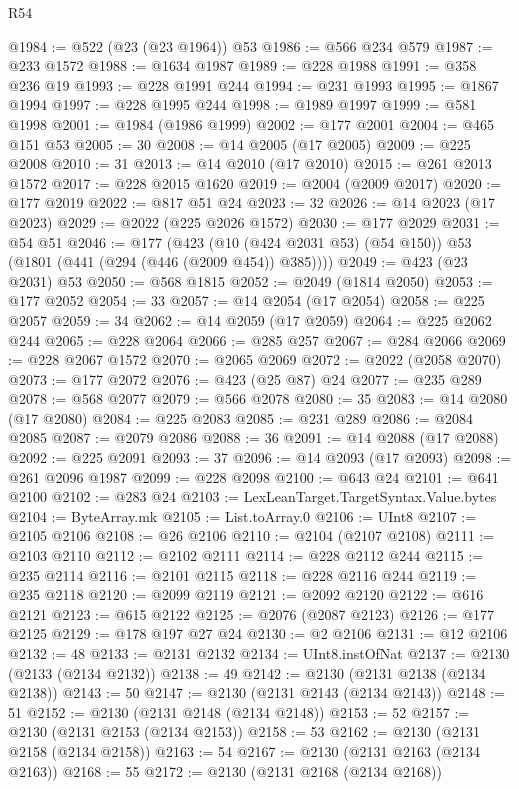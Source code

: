 \begin{lexlean}{R54}
\begin{coremodule}
@1984 := @522 (@23 (@23 @1964)) @53
@1986 := @566 @234 @579
@1987 := @233 @1572
@1988 := @1634 @1987
@1989 := @228 @1988
@1991 := @358 @236 @19
@1993 := @228 @1991 @244
@1994 := @231 @1993
@1995 := @1867 @1994
@1997 := @228 @1995 @244
@1998 := @1989 @1997
@1999 := @581 @1998
@2001 := @1984 (@1986 @1999)
@2002 := @177 @2001
@2004 := @465 @151 @53
@2005 := 30
@2008 := @14 @2005 (@17 @2005)
@2009 := @225 @2008
@2010 := 31
@2013 := @14 @2010 (@17 @2010)
@2015 := @261 @2013 @1572
@2017 := @228 @2015 @1620
@2019 := @2004 (@2009 @2017)
@2020 := @177 @2019
@2022 := @817 @51 @24
@2023 := 32
@2026 := @14 @2023 (@17 @2023)
@2029 := @2022 (@225 @2026 @1572)
@2030 := @177 @2029
@2031 := @54 @51
@2046 := @177
    (@423 (@10 (@424 @2031 @53) (@54 @150)) @53 (@1801 (@441 (@294 (@446 (@2009 @454)) @385))))
@2049 := @423 (@23 @2031) @53
@2050 := @568 @1815
@2052 := @2049 (@1814 @2050)
@2053 := @177 @2052
@2054 := 33
@2057 := @14 @2054 (@17 @2054)
@2058 := @225 @2057
@2059 := 34
@2062 := @14 @2059 (@17 @2059)
@2064 := @225 @2062 @244
@2065 := @228 @2064
@2066 := @285 @257
@2067 := @284 @2066
@2069 := @228 @2067 @1572
@2070 := @2065 @2069
@2072 := @2022 (@2058 @2070)
@2073 := @177 @2072
@2076 := @423 (@25 @87) @24
@2077 := @235 @289
@2078 := @568 @2077
@2079 := @566 @2078
@2080 := 35
@2083 := @14 @2080 (@17 @2080)
@2084 := @225 @2083
@2085 := @231 @289
@2086 := @2084 @2085
@2087 := @2079 @2086
@2088 := 36
@2091 := @14 @2088 (@17 @2088)
@2092 := @225 @2091
@2093 := 37
@2096 := @14 @2093 (@17 @2093)
@2098 := @261 @2096 @1987
@2099 := @228 @2098
@2100 := @643 @24
@2101 := @641 @2100
@2102 := @283 @24
@2103 := LexLeanTarget.TargetSyntax.Value.bytes
@2104 := ByteArray.mk
@2105 := List.toArray.{0}
@2106 := UInt8
@2107 := @2105 @2106
@2108 := @26 @2106
@2110 := @2104 (@2107 @2108)
@2111 := @2103 @2110
@2112 := @2102 @2111
@2114 := @228 @2112 @244
@2115 := @235 @2114
@2116 := @2101 @2115
@2118 := @228 @2116 @244
@2119 := @235 @2118
@2120 := @2099 @2119
@2121 := @2092 @2120
@2122 := @616 @2121
@2123 := @615 @2122
@2125 := @2076 (@2087 @2123)
@2126 := @177 @2125
@2129 := @178 @197 @27 @24
@2130 := @2 @2106
@2131 := @12 @2106
@2132 := 48
@2133 := @2131 @2132
@2134 := UInt8.instOfNat
@2137 := @2130 (@2133 (@2134 @2132))
@2138 := 49
@2142 := @2130 (@2131 @2138 (@2134 @2138))
@2143 := 50
@2147 := @2130 (@2131 @2143 (@2134 @2143))
@2148 := 51
@2152 := @2130 (@2131 @2148 (@2134 @2148))
@2153 := 52
@2157 := @2130 (@2131 @2153 (@2134 @2153))
@2158 := 53
@2162 := @2130 (@2131 @2158 (@2134 @2158))
@2163 := 54
@2167 := @2130 (@2131 @2163 (@2134 @2163))
@2168 := 55
@2172 := @2130 (@2131 @2168 (@2134 @2168))

\end{coremodule}
\end{lexlean}
